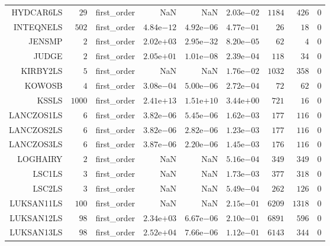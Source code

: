 \begin{longtable}{rrrrrrrrr}
HYDCAR6LS & \(    29\) & first\_order &       NaN &       NaN & \( 2.03\)e\(-02\) & \(  1184\) & \(   426\) & \(     0\) \\
INTEQNELS & \(   502\) & first\_order & \( 4.84\)e\(-12\) & \( 4.92\)e\(-06\) & \( 4.77\)e\(-01\) & \(    26\) & \(    18\) & \(     0\) \\
JENSMP & \(     2\) & first\_order & \( 2.02\)e\(+03\) & \( 2.95\)e\(-32\) & \( 8.20\)e\(-05\) & \(    62\) & \(     4\) & \(     0\) \\
JUDGE & \(     2\) & first\_order & \( 2.05\)e\(+01\) & \( 1.01\)e\(-08\) & \( 2.39\)e\(-04\) & \(   118\) & \(    34\) & \(     0\) \\
KIRBY2LS & \(     5\) & first\_order &       NaN &       NaN & \( 1.76\)e\(-02\) & \(  1032\) & \(   358\) & \(     0\) \\
KOWOSB & \(     4\) & first\_order & \( 3.08\)e\(-04\) & \( 5.00\)e\(-06\) & \( 2.72\)e\(-04\) & \(    72\) & \(    62\) & \(     0\) \\
KSSLS & \(  1000\) & first\_order & \( 2.41\)e\(+13\) & \( 1.51\)e\(+10\) & \( 3.44\)e\(+00\) & \(   721\) & \(    16\) & \(     0\) \\
LANCZOS1LS & \(     6\) & first\_order & \( 3.82\)e\(-06\) & \( 5.45\)e\(-06\) & \( 1.62\)e\(-03\) & \(   177\) & \(   116\) & \(     0\) \\
LANCZOS2LS & \(     6\) & first\_order & \( 3.82\)e\(-06\) & \( 2.82\)e\(-06\) & \( 1.23\)e\(-03\) & \(   177\) & \(   116\) & \(     0\) \\
LANCZOS3LS & \(     6\) & first\_order & \( 3.87\)e\(-06\) & \( 2.20\)e\(-06\) & \( 1.45\)e\(-03\) & \(   176\) & \(   116\) & \(     0\) \\
LOGHAIRY & \(     2\) & first\_order &       NaN &       NaN & \( 5.16\)e\(-04\) & \(   349\) & \(   349\) & \(     0\) \\
LSC1LS & \(     3\) & first\_order &       NaN &       NaN & \( 1.73\)e\(-03\) & \(   377\) & \(   318\) & \(     0\) \\
LSC2LS & \(     3\) & first\_order &       NaN &       NaN & \( 5.49\)e\(-04\) & \(   262\) & \(   126\) & \(     0\) \\
LUKSAN11LS & \(   100\) & first\_order &       NaN &       NaN & \( 2.15\)e\(-01\) & \(  6209\) & \(  1318\) & \(     0\) \\
LUKSAN12LS & \(    98\) & first\_order & \( 2.34\)e\(+03\) & \( 6.67\)e\(-06\) & \( 2.10\)e\(-01\) & \(  6891\) & \(   596\) & \(     0\) \\
LUKSAN13LS & \(    98\) & first\_order & \( 2.52\)e\(+04\) & \( 7.66\)e\(-06\) & \( 1.12\)e\(-01\) & \(  6143\) & \(   344\) & \(     0\) \\

\end{longtable}

